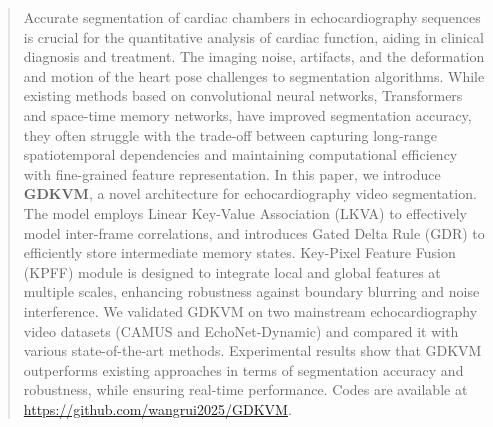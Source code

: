 \begin{abstract}
Accurate segmentation of cardiac chambers in echocardiography sequences is crucial for the quantitative analysis of cardiac function, aiding in clinical diagnosis and treatment.
The imaging noise, artifacts, and the deformation and motion of the heart pose challenges to segmentation algorithms. 
While existing methods based on convolutional neural networks, Transformers and space-time memory networks, have improved segmentation accuracy, they often struggle with the trade-off between capturing long-range spatiotemporal dependencies and maintaining computational efficiency with fine-grained feature representation. 
In this paper, we introduce \textbf{GDKVM}, a novel architecture for echocardiography video segmentation. 
The model employs Linear Key-Value Association (LKVA) to effectively model inter-frame correlations, and introduces Gated Delta Rule (GDR) to efficiently store intermediate memory states. Key-Pixel Feature Fusion (KPFF) module is designed to integrate local and global features at multiple scales, enhancing robustness against boundary blurring and noise interference. 
We validated GDKVM on two mainstream echocardiography video datasets (CAMUS and EchoNet-Dynamic) and compared it with various state-of-the-art methods. 
Experimental results show that GDKVM outperforms existing approaches in terms of segmentation accuracy and robustness, while ensuring real-time performance. 
Codes are available at \url{https://github.com/wangrui2025/GDKVM}. 
\end{abstract}